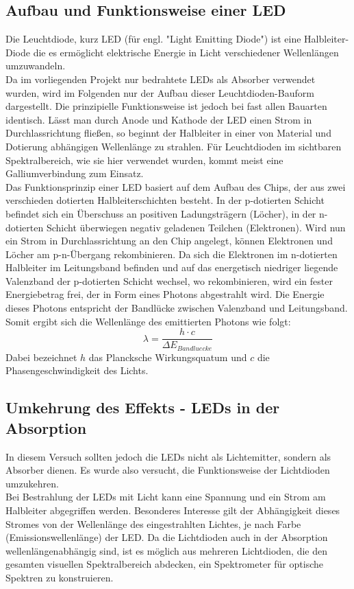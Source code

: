 \documentclass[11pt]{scrartcl}
\begin{document}
\subsection{Aufbau und Funktionsweise einer LED}
Die Leuchtdiode, kurz LED (für engl. "Light Emitting Diode") ist eine Halbleiter-Diode die es ermöglicht elektrische Energie in Licht verschiedener Wellenlängen umzuwandeln.\\
Da im vorliegenden Projekt nur bedrahtete LEDs als Absorber verwendet wurden, wird im Folgenden nur der Aufbau dieser Leuchtdioden-Bauform dargestellt. Die prinzipielle Funktionsweise ist jedoch bei fast allen Bauarten identisch. Lässt man durch Anode und Kathode der LED einen Strom in Durchlassrichtung fließen, so beginnt der Halbleiter in einer von Material und Dotierung abhängigen Wellenlänge zu strahlen. Für Leuchtdioden im sichtbaren Spektralbereich, wie sie hier verwendet wurden, kommt meist eine Galliumverbindung zum Einsatz.\\
Das Funktionsprinzip einer LED basiert auf dem Aufbau des Chips, der aus zwei verschieden dotierten Halbleiterschichten besteht. In der p-dotierten Schicht befindet sich ein Überschuss an positiven Ladungsträgern (Löcher), in der n-dotierten Schicht überwiegen negativ geladenen Teilchen (Elektronen). Wird nun ein Strom in Durchlassrichtung an den Chip angelegt, können Elektronen und Löcher am p-n-Übergang rekombinieren. Da sich die Elektronen im n-dotierten Halbleiter im Leitungsband befinden und auf das energetisch niedriger liegende Valenzband der p-dotierten Schicht wechsel, wo rekombinieren, wird ein fester Energiebetrag frei, der in Form eines Photons abgestrahlt wird. Die Energie dieses Photons entspricht der Bandlücke zwischen Valenzband und Leitungsband. Somit ergibt sich die Wellenlänge des emittierten Photons wie folgt:
 \[ \lambda = \frac{h \cdot c}{\Delta E_{Bandluecke}} \]
Dabei bezeichnet $h$ das Plancksche Wirkungsquatum und $c$ die Phasengeschwindigkeit des Lichts.

\subsection{Umkehrung des Effekts - LEDs in der Absorption}
In diesem Versuch sollten jedoch die LEDs nicht als Lichtemitter, sondern als Absorber dienen. Es wurde also versucht, die Funktionsweise der Lichtdioden umzukehren. \\
Bei Bestrahlung der LEDs mit Licht kann eine Spannung und ein Strom am Halbleiter abgegriffen werden. Besonderes Interesse gilt der Abhängigkeit dieses Stromes von der Wellenlänge des eingestrahlten Lichtes, je nach Farbe (Emissionswellenlänge) der LED. Da die Lichtdioden auch in der Absorption wellenlängenabhängig sind, ist es möglich aus mehreren Lichtdioden, die den gesamten visuellen Spektralbereich abdecken, ein Spektrometer für optische Spektren zu konstruieren.
\end{document}
